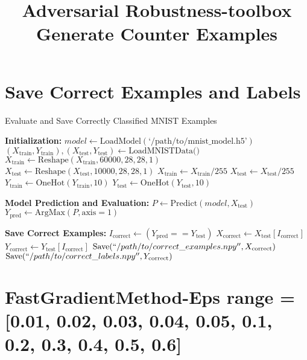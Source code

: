 \documentclass[11pt,onside]{article}
\title{\blue Adversarial Robustness-toolbox \\
\blueb Generate Counter Examples}
\begin{document}
\maketitle


\section{Save Correct Examples and Labels}

\begin{algorithm}[H]
\caption{Evaluate and Save Correctly Classified MNIST Examples}
\begin{algorithmic}[1]

\State \textbf{Initialization:}
\State $model \gets \text{LoadModel}(\text{`/path/to/mnist\_model.h5'})$
\State $(X_{\text{train}}, Y_{\text{train}}), (X_{\text{test}}, Y_{\text{test}}) \gets \text{LoadMNISTData()}$
\State $X_{\text{train}} \gets \text{Reshape}(X_{\text{train}}, 60000, 28, 28, 1)$
\State $X_{\text{test}} \gets \text{Reshape}(X_{\text{test}}, 10000, 28, 28, 1)$
\State $X_{\text{train}} \gets X_{\text{train}} / 255$
\State $X_{\text{test}} \gets X_{\text{test}} / 255$
\State $Y_{\text{train}} \gets \text{OneHot}(Y_{\text{train}}, 10)$
\State $Y_{\text{test}} \gets \text{OneHot}(Y_{\text{test}}, 10)$

\State \textbf{Model Prediction and Evaluation:}
\State $P \gets \text{Predict}(model, X_{\text{test}})$
\State $Y_{\text{pred}} \gets \text{ArgMax}(P, \text{axis}=1)$

\State \textbf{Save Correct Examples:}
\State $I_{\text{correct}} \gets (Y_{\text{pred}} == Y_{\text{test}})$
\State $X_{\text{correct}} \gets X_{\text{test}}[I_{\text{correct}}]$
\State $Y_{\text{correct}} \gets Y_{\text{test}}[I_{\text{correct}}]$
\State $\text{Save}(``/path/to/correct\_examples.npy'', X_{\text{correct}})$
\State $\text{Save}(``/path/to/correct\_labels.npy'', Y_{\text{correct}})$

\end{algorithmic}
\end{algorithm}

\section{FastGradientMethod-Eps range = [0.01, 0.02, 0.03, 0.04, 0.05, 0.1, 0.2, 0.3, 0.4, 0.5, 0.6]}
\end{document}
